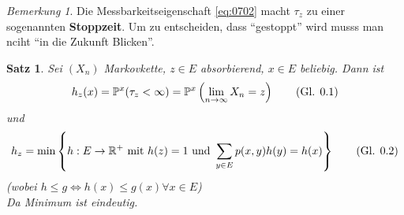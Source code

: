 \documentclass[10pt,a4paper]{article}
\newcommand{\R}{\ensuremath{\mathbb{R}}}
\newcommand{\Prb}{\mathbb P}
\theoremstyle{plain}
\newtheorem{satz}[theorem]{Satz}
\theoremstyle{definition}
\theoremstyle{remark}
\newtheorem*{bem*}{Bemerkung}
\newcommand{\autotag}{\stepcounter{equation}\tag{Gl. \arabic{section}.\arabic{equation}}}
\begin{document}
	\begin{bem*}
		Die Messbarkeitseigenschaft \ref{eq:0702} macht $\tau_z$ zu einer sogenannten \textbf{Stoppzeit}. Um zu entscheiden, dass \enquote{gestoppt} wird musss man nciht \enquote{in die Zukunft Blicken}.
	\end{bem*}

	\begin{satz}\label{0713}
		Sei $(X_n)$ Markovkette, $z\in E$ absorbierend, $x\in E$ beliebig. Dann ist
		\[h_z(x)=\Prb^x(\tau_z<\infty)=\Prb^x\left(\lim\limits_{n\to\infty}X_n=z\right)\autotag\label{eq:0703}\]
		und
		\[h_z=\min\left\{h:E\to\R^+\text{ mit }h(z)=1\text{ und }\sum_{y\in E}p(x,y)h(y)=h(x)\right\} \autotag \label{eq:0704}\]
		(wobei $h\leq g\Leftrightarrow h(x)\leq g(x)\forall x\in E$)\\
		Da Minimum ist eindeutig.
	\end{satz}
\end{document}
